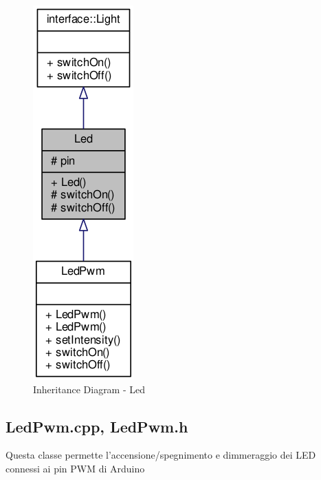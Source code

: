 \begin{figure}[!ht]
	\centering
	\includegraphics[scale=.5]{img/UML/InheritanceDiagram/Led.png}
	\caption{Inheritance Diagram - Led}
\end{figure}

\newpage
\subsection{LedPwm.cpp, LedPwm.h}
Questa classe permette l'accensione/spegnimento e dimmeraggio dei LED connessi ai pin PWM di Arduino
